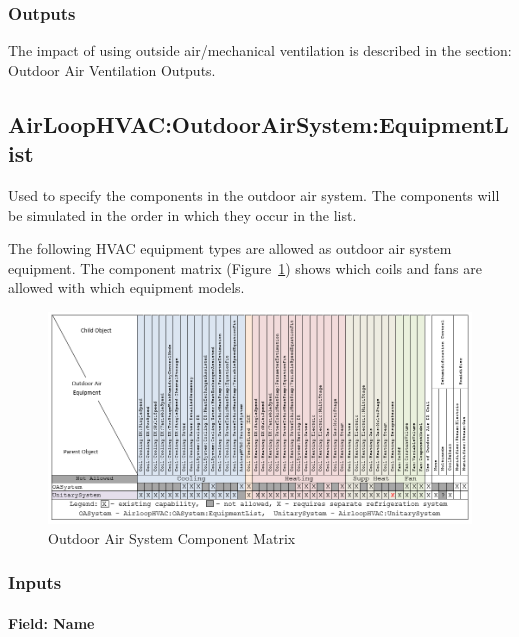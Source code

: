 \subsubsection{Outputs}\label{outputs-2-001}

The impact of using outside air/mechanical ventilation is described in the section: Outdoor Air Ventilation Outputs.

\subsection{AirLoopHVAC:OutdoorAirSystem:EquipmentList}\label{airloophvacoutdoorairsystemequipmentlist}

Used to specify the components in the outdoor air system. The components will be simulated in the order in which they occur in the list.

The following HVAC equipment types are allowed as outdoor air system equipment. The component matrix (Figure~\ref{fig:outdoor-air-system-component-matrix}) shows which coils and fans are allowed with which equipment models.

\begin{figure}[htbp]
\centering
\includegraphics{media/OASysComponentMatrix.png}
\caption{Outdoor Air System Component Matrix \protect \label{fig:outdoor-air-system-component-matrix}}
\end{figure}

\subsubsection{Inputs}\label{inputs-4-001}

\paragraph{Field: Name}\label{field-name-4-001}


